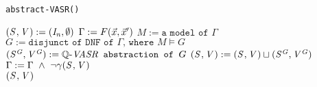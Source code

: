 
	\begin{algorithm}
		\caption{\texttt{abstract-VASR(\tranFormula)}}\label{euclid}
		\begin{algorithmic}[1]
			\State $\mathit{(S^{}, V^{})} := (\mathit{I_n}, \emptyset)$
			\State $\Gamma := F(\vec{x}, \vec{x}')$
			\State $M := \texttt{a model of } \Gamma$
			\State $G := \texttt{disjunct of DNF of } \Gamma \texttt{, where } M \models G$
			\State $\mathit{(S^{G}, V^{G})} := \mathit{\mathbb{Q} \text{-}VASR} \texttt{ abstraction of }G$
			\State $\mathit{(S^{}, V^{})} := \mathit{(S^{}, V^{})} \sqcup \mathit{(S^{G}, V^{G})}$
			\State $\Gamma := \Gamma\ \land\ \neg\gamma\abst{}$
			\EndWhile \\
			\Return $\mathit{(S^{}, V^{})}$
		\end{algorithmic}
	\end{algorithm}
